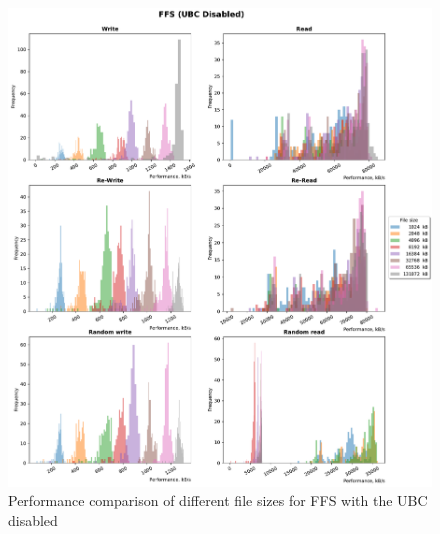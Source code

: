 \begin{figure}[!htb]
	\label{fig:bench_ffs_without_cache}
	\begin{center}
		\includegraphics[width=1.0\textwidth]{figures.nosync/benchmarking/FFS/FFS-UBC Disabled-hist.pdf}
	\end{center}
	\caption[Performance comparison for FFS with the UBC disabled]{Performance comparison of different file sizes for FFS with the UBC disabled}
\end{figure}
\clearpage


